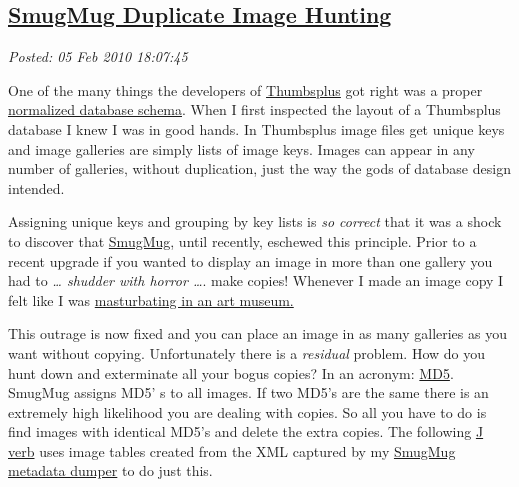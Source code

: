 %

\subsection*{\href{https://bakerjd99.wordpress.com/2010/02/05/smugmug-duplicate-image-hunting/}{SmugMug Duplicate Image Hunting}}


\noindent\emph{Posted: 05 Feb 2010 18:07:45}
\vspace{6pt}

One of the many things the developers of
\href{http://www.cerious.com/}{Thumbsplus} got right was a proper
\href{http://en.wikipedia.org/wiki/Database\_normalization}{normalized
database schema}. When I first inspected the layout of a Thumbsplus
database I knew I was in good hands. In Thumbsplus image files get
unique keys and image galleries are simply lists of image keys. Images
can appear in any number of galleries, without duplication, just the way
the gods of database design intended.

Assigning unique keys and grouping by key lists is \emph{so correct}
that it was a shock to discover that
\href{http://www.smugmug.com/}{SmugMug}, until recently, eschewed this
principle. Prior to a recent upgrade if you wanted to display an image
in more than one gallery you had to \emph{\ldots{} shudder with horror
\ldots{}}. make copies! Whenever I made an image copy I felt like I was
\href{http://www.goarticles.com/cgi-bin/showa.cgi?C=1331827}{masturbating
in an art museum.}

This outrage is now fixed and you can place an image in as many
galleries as you want without copying. Unfortunately there is a
\emph{residual} problem. How do you hunt down and exterminate all your
bogus copies? In an acronym:
\href{http://www.fastsum.com/support/md5-checksum-utility-faq/md5-hash.php}{MD5}.
SmugMug assigns MD5' s to all images. If two MD5's are the same there is
an extremely high likelihood you are dealing with copies. So all you
have to do is find images with identical MD5's and delete the extra
copies. The following \href{http://www.jsoftware.com/}{J verb} uses image
tables created from the XML captured by my
\href{http://bakerjd99.wordpress.com/2010/02/03/command-line-c-smugmug-api-metadata-download/}{SmugMug
metadata dumper} to do just this.


